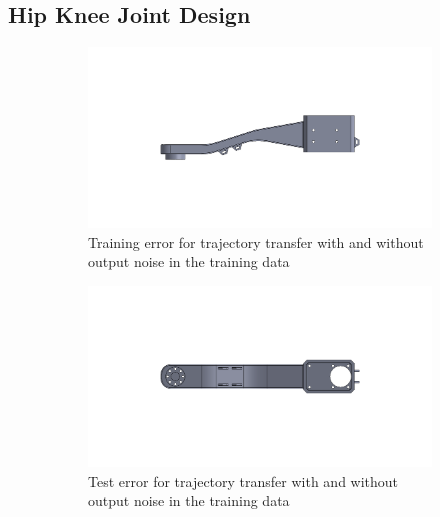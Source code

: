 \subsection{Hip Knee Joint Design}
\begin{figure}[h!]
	\centering
	\begin{subfigure}[t]{0.495\textwidth}
		\centering\captionsetup{width=.87\linewidth}
		\includegraphics[width=\textwidth]{Body_Knee_Joint_1}
		\caption{Training error for trajectory transfer with and without output noise in the training data}
		\label{subfig:sim1_lsd_results_training}
	\end{subfigure}
	\hfill
	\begin{subfigure}[t]{0.495\textwidth}
		\centering\captionsetup{width=.87\linewidth}
		\includegraphics[width=\textwidth]{Body_Knee_Joint_2}
		\caption{Test error for trajectory transfer with and without output noise in the training data}
		\label{subfig:sim1_lsd_results_test}
	\end{subfigure}
	\par\bigskip
	\begin{subfigure}[t]{1\textwidth}
		\centering\captionsetup{width=.87\linewidth}

\end{subfigure}
\end{figure}
